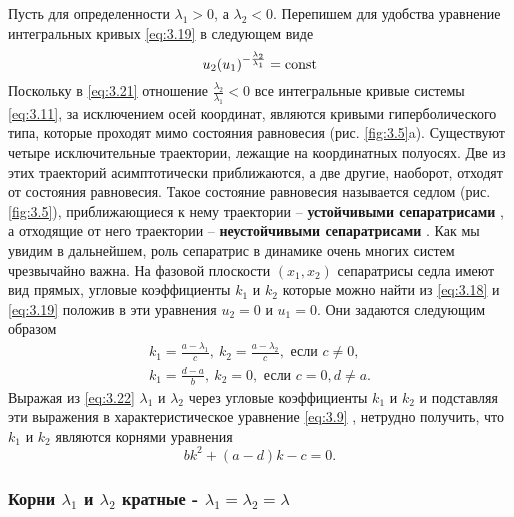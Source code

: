 Пусть для определенности $\lambda_1>0$, а $\lambda_2<0$. Перепишем для удобства уравнение интегральных кривых \eqref{eq:3.19} в следующем виде
\begin{equation}
        \label{eq:3.21}
        u_2(u_1)^{- \frac{\lambda_2}{\lambda_1}} = \textrm{const}   
\end{equation}
Поскольку в \eqref{eq:3.21} отношение $\frac{\lambda_2}{\lambda_1}<0$
все интегральные кривые системы \eqref{eq:3.11},
за исключением осей координат, являются кривыми гиперболического типа, которые проходят мимо состояния равновесия (рис. \ref{fig:3.5}a). 
Существуют
четыре исключительные траектории, лежащие на координатных
полуосях. Две из этих траекторий асимптотически приближаются, а две другие,
наоборот, отходят от состояния равновесия. Такое состояние равновесия
называется седлом (рис.\ref{fig:3.5}), приближающиеся к нему траектории --
\textbf{устойчивыми сепаратрисами} , а отходящие от него траектории --
\textbf{неустойчивыми сепаратрисами} . Как мы увидим в дальнейшем, роль
сепаратрис в динамике очень многих систем чрезвычайно важна. На фазовой
плоскости $(x_1,x_2)$ сепаратрисы седла имеют вид прямых, угловые
коэффициенты  $k_{1}$ и $k_2$   которые можно найти из \eqref{eq:3.18} и \eqref{eq:3.19} положив в эти
уравнения $u_2=0$ и $u_1=0$. Они задаются следующим образом
\begin{equation}
        \label{eq:3.22}
        \begin{aligned}
                k_1 = \frac{a-\lambda_1}{c}, ~ k_2= \frac{a-\lambda_2}{c}, \text{ если } c\neq 0,\\
                k_1 = \frac{d-a}{b}, ~k_2=0, \text{ если } c=0, d\neq a.
        \end{aligned}
\end{equation}
Выражая из \eqref{eq:3.22} $\lambda_1$ и $\lambda_2$ через угловые коэффициенты $k_1$ и $k_2$ и подставляя эти выражения в характеристическое уравнение \eqref{eq:3.9} , нетрудно получить, что 
$k_1$ и $k_2$ являются корнями уравнения
\begin{equation}
        \label{eq:3.23}
        bk^2 +(a-d) k -c =0. 
\end{equation}

\subsubsection{Корни $\lambda_1$ и $\lambda_2$ кратные - $\lambda_1=\lambda_2=\lambda$}%
\label{ssub:_korni_lambda_1_i_lambda_2_kratnye}


